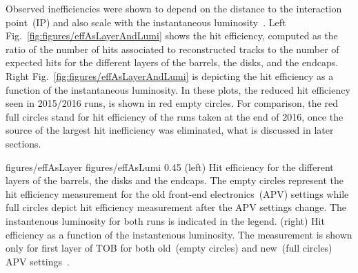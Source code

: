 Observed inefficiencies were shown to depend on the distance to the interaction point~(IP) and also scale with the instantaneous luminosity~\cite{website:hitEff}. Left Fig.~\ref{fig:figures/effAsLayerAndLumi} shows the hit efficiency, computed as the ratio of the number of hits associated to reconstructed tracks to the number of expected hits for the different layers of the barrels, the disks, and the endcaps. Right Fig.~\ref{fig:figures/effAsLayerAndLumi} is depicting the hit efficiency  as a function of the instantaneous luminosity. In these plots, the reduced hit efficiency seen in 2015/2016 runs, is shown in red empty circles. For comparison, the red full circles stand for hit efficiency of the runs taken at the end of 2016, once the source of the largest hit inefficiency was eliminated, what is discussed in later sections.


                 {figures/effAsLayer}
                 {figures/effAsLumi} %
                 {0.45}       %
                 {(left) Hit efficiency for the different layers of the barrels, the disks and the endcaps. The empty circles represent the hit efficiency measurement for the old front-end electronics~(APV) settings while full circles depict hit efficiency measurement after the APV settings change. The instantenous luminosity for both runs is indicated in the legend. (right) Hit efficiency as a function of the instantenous luminosity. The measurement is shown only for first layer of TOB for both old~(empty circles) and new~(full circles) APV settings~\cite{website:hitEff}. } %







